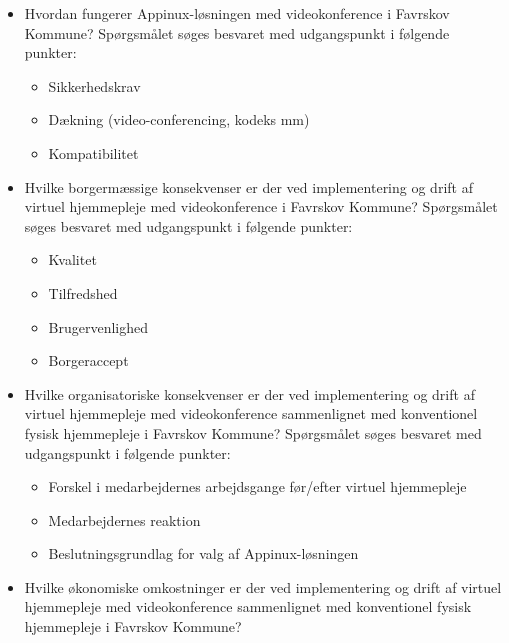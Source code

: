 \begin{itemize}
	\item Hvordan fungerer Appinux-løsningen med videokonference i Favrskov Kommune? Spørgsmålet søges besvaret med udgangspunkt i følgende punkter:
	\begin{itemize}
	\item Sikkerhedskrav
	\item Dækning (video-conferencing, kodeks mm)
	\item Kompatibilitet 
\end{itemize}
\end{itemize}

\begin{itemize}
	\item Hvilke borgermæssige konsekvenser er der ved implementering og drift af virtuel hjemmepleje med videokonference i Favrskov Kommune? Spørgsmålet søges besvaret med udgangspunkt i følgende punkter:
	\begin{itemize}
	\item Kvalitet 
	\item Tilfredshed
	\item Brugervenlighed
	\item Borgeraccept
\end{itemize}
\end{itemize}

\begin{itemize}
	\item Hvilke organisatoriske konsekvenser er der ved implementering og drift af virtuel hjemmepleje med videokonference sammenlignet med konventionel fysisk hjemmepleje i Favrskov Kommune? Spørgsmålet søges besvaret med udgangspunkt i følgende punkter:
	\begin{itemize}
	\item Forskel i medarbejdernes arbejdsgange før/efter virtuel hjemmepleje
	\item Medarbejdernes reaktion
	\item Beslutningsgrundlag for valg af Appinux-løsningen 
\end{itemize}
\end{itemize}


\begin{itemize}
	\item Hvilke økonomiske omkostninger er der ved implementering og drift af virtuel hjemmepleje med videokonference sammenlignet med konventionel fysisk hjemmepleje i Favrskov Kommune?
\end{itemize}


